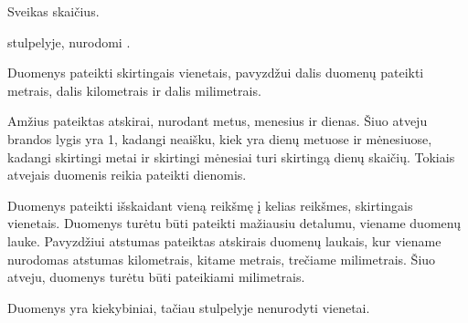 \documentclass[letterpaper,10pt,lithuanian]{sphinxmanual}
\begin{document}
\begin{fulllineitems}
\label{\detokenize{tipai:type.integer}}
\pysigstartsignatures
\pysigline
{}
\pysigstopsignatures
\sphinxAtStartPar
Sveikas skaičius.

\sphinxAtStartPar
{\hyperref[\detokenize{dimensijos:property.ref}]{}} stulpelyje, nurodomi {\hyperref[\detokenize{vienetai:matavimo-vienetai}]{}}.

\begin{sphinxtopic}
\begin{description}
\sphinxAtStartPar
Duomenys pateikti skirtingais vienetais, pavyzdžui dalis duomenų
pateikti metrais, dalis kilometrais ir dalis milimetrais.

\sphinxAtStartPar
Amžius pateiktas atskirai, nurodant metus, menesius ir dienas. Šiuo
atveju brandos lygis yra 1, kadangi neaišku, kiek yra dienų metuose
ir mėnesiuose, kadangi skirtingi metai ir skirtingi mėnesiai turi
skirtingą dienų skaičių. Tokiais atvejais duomenis reikia pateikti
dienomis.

\sphinxAtStartPar
Duomenys pateikti išskaidant vieną reikšmę į kelias reikšmes,
skirtingais vienetais. Duomenys turėtu būti pateikti mažiausiu
detalumu, viename duomenų lauke. Pavyzdžiui atstumas pateiktas
atskirais duomenų laukais, kur viename nurodomas atstumas
kilometrais, kitame metrais, trečiame milimetrais. Šiuo atveju,
duomenys turėtu būti pateikiami milimetrais.

\sphinxAtStartPar
Duomenys yra kiekybiniai, tačiau {\hyperref[\detokenize{dimensijos:property.ref}]{}} stulpelyje
nenurodyti vienetai.

\end{description}
\end{sphinxtopic}

\end{fulllineitems}
\end{document}
